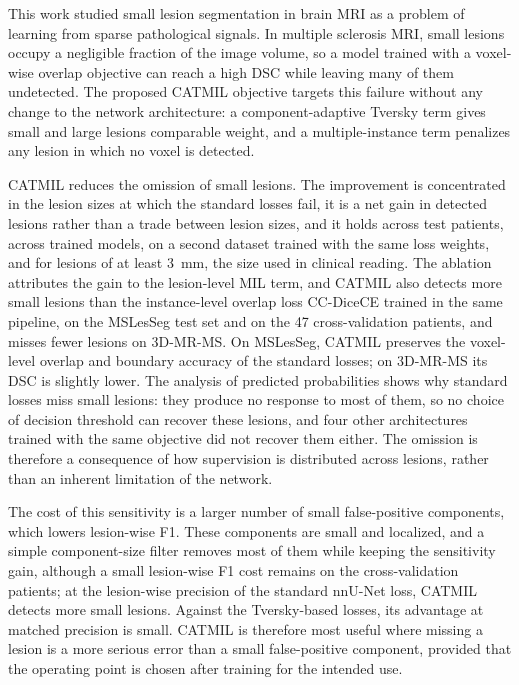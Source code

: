 This work studied small lesion segmentation in brain MRI as a problem of
learning from sparse pathological signals. In multiple sclerosis MRI, small
lesions occupy a negligible fraction of the image volume, so a model
trained with a voxel-wise overlap objective can reach a high DSC while
leaving many of them undetected. The proposed CATMIL objective targets this
failure without any change to the network architecture: a
component-adaptive Tversky term gives small and large lesions comparable
weight, and a multiple-instance term penalizes any lesion in which no voxel
is detected.

CATMIL reduces the omission of small lesions. The improvement is
concentrated in the lesion sizes at which the standard losses fail, it is a
net gain in detected lesions rather than a trade between lesion sizes, and
it holds across test patients, across trained models, on a second dataset
trained with the same loss weights, and for lesions of at least 3~mm, the
size used in clinical reading. The ablation attributes the gain to the
lesion-level MIL term, and CATMIL also detects more small lesions than the
instance-level overlap loss CC-DiceCE trained in the same pipeline, on the
MSLesSeg test set and on the 47 cross-validation patients, and misses fewer
lesions on 3D-MR-MS. On MSLesSeg, CATMIL preserves the voxel-level
overlap and boundary accuracy of the standard losses; on 3D-MR-MS its DSC
is slightly lower. The analysis of predicted probabilities
shows why standard losses miss small lesions: they produce no response to
most of them, so no choice of decision threshold can recover these lesions,
and four other architectures trained with the same objective did not
recover them either.
The omission is therefore a consequence of how supervision is distributed
across lesions, rather than an inherent limitation of the network.

The cost of this sensitivity is a larger number of small false-positive
components, which lowers lesion-wise F1. These components are small and
localized, and a simple component-size filter removes most of them while
keeping the sensitivity gain, although a small lesion-wise F1 cost remains
on the cross-validation patients; at the lesion-wise precision of the standard
nnU-Net loss, CATMIL detects more small lesions. Against the
Tversky-based losses, its advantage at matched precision is small. CATMIL
is therefore most useful where missing
a lesion is a more serious error than a small false-positive component,
provided that the operating point is chosen after training for the
intended use.
